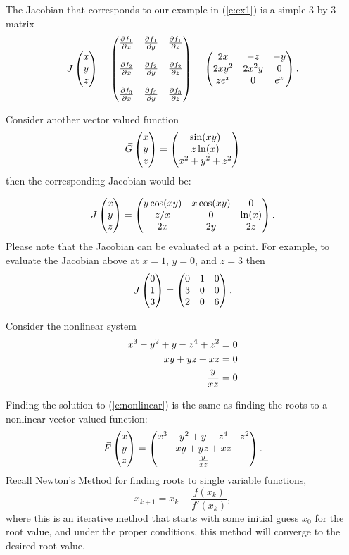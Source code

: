 \documentclass[twoside]{article}
\begin{document}
The Jacobian that corresponds to our example in (\ref{e:ex1}) is a simple 3 by 3 matrix
$$J\begin{pmatrix} x \cr y \cr z \end{pmatrix} = \begin{pmatrix} \frac {\partial f_1}{\partial x} & \frac {\partial f_1}{\partial y} &  \frac {\partial f_1}{\partial z}   \cr  \cr \frac {\partial f_2}{\partial x} & \frac {\partial f_2}{\partial y} &  \frac {\partial f_2}{\partial z} \cr \cr \frac {\partial f_3}{\partial x} & \frac {\partial f_3}{\partial y}  & \frac {\partial f_3}{\partial z}  \end{pmatrix} = \begin{pmatrix} 2x &  -z &  -y   \cr  2xy^2 &  2x^2y &  0 \cr  ze^x & 0 & e^x  \end{pmatrix}.$$
 
 Consider another vector valued function
$$ \vec G \begin{pmatrix} x \cr y \cr z \end{pmatrix}=\begin{pmatrix} \sin(xy) \cr z\ln(x) \cr x^2+y^2+z^2 \end{pmatrix}$$
then the corresponding Jacobian would be:

$$J\begin{pmatrix} x \cr y \cr z \end{pmatrix}=\begin{pmatrix} y\cos(xy) & x\cos(xy) &  0   \cr  z/x &  0 &  \ln(x) \cr  2x & 2y & 2z   \end{pmatrix}.$$
Please note that the Jacobian can be evaluated at a point. For example, to evaluate the Jacobian above at $x=1$, $y=0$, and $z=3$ then
$$J\begin{pmatrix} 0 \cr 1 \cr 3 \end{pmatrix}=\begin{pmatrix} 0 & 1 &  0   \cr  3 &  0 &  0 \cr  2 & 0 & 6  \end{pmatrix}.$$

Consider the nonlinear system
\begin{eqnarray}
x^3-y^2+y-z^4+z^2 = 0 \cr
xy + yz + xz = 0 \cr
\frac y{xz} = 0 \label{e:nonlinear}
\end{eqnarray}

Finding the solution to (\ref{e:nonlinear}) is the same as finding the roots to a nonlinear vector valued function:
$$\vec F\begin{pmatrix} x \cr y \cr z \end{pmatrix} = \begin{pmatrix}  x^3-y^2+y-z^4+z^2 \cr xy + yz + xz \cr \frac y{xz}  \end{pmatrix}.$$
Recall Newton's Method for finding roots to single variable functions,
$$x_{k+1} = x_k - \frac {f(x_k)}{f'(x_k)},$$
where this is an iterative method that starts with some initial guess $x_0$ for the root value, and under the proper conditions, this method will converge to the desired root value.
\end{document}
